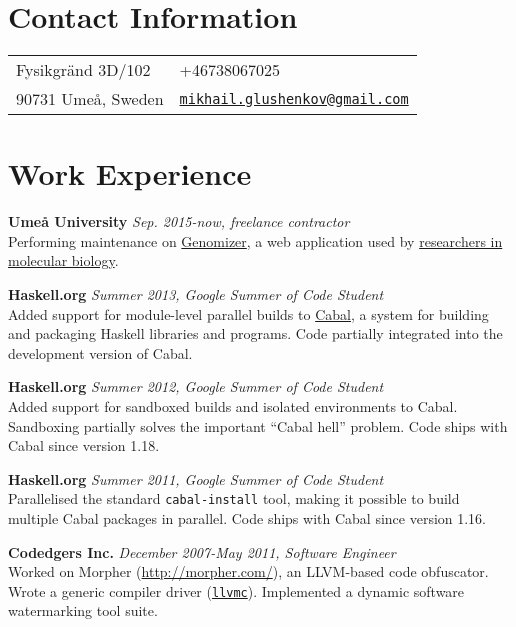\documentclass[margin,line]{res}
\begin{document}

\begin{resume}
\section{\sc Contact Information}
\vspace{.05in}
\begin{tabular}{@{}p{2in}p{4in}}
Fysikgränd 3D/102&
+46738067025\\
90731 Umeå, Sweden&
\href{mailto:mikhail.glushenkov@gmail.com}
{\texttt{mikhail.glushenkov@gmail.com}}\\
\end{tabular}

\section{\sc Work Experience}

{\bf Umeå University} \hfill {\it Sep. 2015-now, freelance contractor}\\
Performing maintenance on \href{https://github.com/genomizer}{Genomizer}, a web
application used by \href{http://www.epicon.nu}{researchers in molecular biology}.

{\bf Haskell.org} \hfill {\it Summer 2013, Google Summer of Code Student}\\
Added support for module-level parallel builds to
\href{http://haskell.org/cabal}{Cabal}, a system for building and packaging
Haskell libraries and programs. Code partially integrated into the development
version of Cabal.

{\bf Haskell.org} \hfill {\it Summer 2012, Google Summer of Code Student}\\
Added support for sandboxed builds and isolated environments to
Cabal. Sandboxing partially solves the important ``Cabal hell'' problem. Code
ships with Cabal since version 1.18.

{\bf Haskell.org} \hfill {\it Summer 2011, Google Summer of Code Student}\\
Parallelised the standard \texttt{cabal-install} tool, making it possible to
build multiple Cabal packages in parallel. Code ships with Cabal since version
1.16.

{\bf Codedgers Inc.} \hfill {\it December 2007-May 2011, Software Engineer}\\
Worked on Morpher (\url{http://morpher.com/}), an LLVM-based code
obfuscator. Wrote a generic compiler driver
(\href{http://llvm.org/releases/2.9/docs/CompilerDriver.html}{\texttt{llvmc}}). Implemented
a dynamic software watermarking tool suite.


\end{resume}
\end{document}
